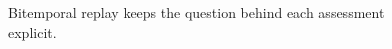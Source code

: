 \begin{figure}[H]
\centering
{}
\caption{Bitemporal replay keeps the question behind each assessment explicit.}\label{fig:teach-M10-06}
\end{figure}
